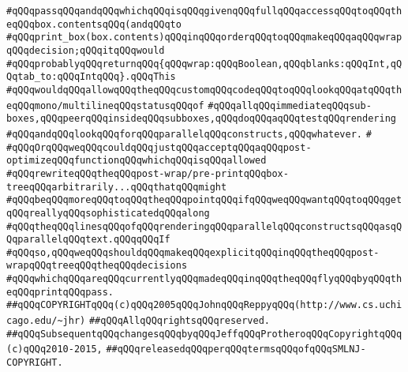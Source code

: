 \verb|#qQQqpassqQQqandqQQqwhichqQQqisqQQqgivenqQQqfullqQQqaccessqQQqtoqQQqtheqQQqbox.contentsqQQq(andqQQqto|\newline
\verb|#qQQqprint_box(box.contents)qQQqinqQQqorderqQQqtoqQQqmakeqQQqaqQQqwrapqQQqdecision;qQQqitqQQqwould|\newline
\verb|#qQQqprobablyqQQqreturnqQQq{qQQqwrap:qQQqBoolean,qQQqblanks:qQQqInt,qQQqtab_to:qQQqIntqQQq}.qQQqThis|\newline
\verb|#qQQqwouldqQQqallowqQQqtheqQQqcustomqQQqcodeqQQqtoqQQqlookqQQqatqQQqtheqQQqmono/multilineqQQqstatusqQQqof|\newline
\verb|#qQQqallqQQqimmediateqQQqsub-boxes,qQQqpeerqQQqinsideqQQqsubboxes,qQQqdoqQQqaqQQqtestqQQqrendering|\newline
\verb|#qQQqandqQQqlookqQQqforqQQqparallelqQQqconstructs,qQQqwhatever.|\newline
\verb|#|\newline
\verb|#qQQqOrqQQqweqQQqcouldqQQqjustqQQqacceptqQQqaqQQqpost-optimizeqQQqfunctionqQQqwhichqQQqisqQQqallowed|\newline
\verb|#qQQqrewriteqQQqtheqQQqpost-wrap/pre-printqQQqbox-treeqQQqarbitrarily...qQQqthatqQQqmight|\newline
\verb|#qQQqbeqQQqmoreqQQqtoqQQqtheqQQqpointqQQqifqQQqweqQQqwantqQQqtoqQQqgetqQQqreallyqQQqsophisticatedqQQqalong|\newline
\verb|#qQQqtheqQQqlinesqQQqofqQQqrenderingqQQqparallelqQQqconstructsqQQqasqQQqparallelqQQqtext.qQQqqQQqIf|\newline
\verb|#qQQqso,qQQqweqQQqshouldqQQqmakeqQQqexplicitqQQqinqQQqtheqQQqpost-wrapqQQqtreeqQQqtheqQQqdecisions|\newline
\verb|#qQQqwhichqQQqareqQQqcurrentlyqQQqmadeqQQqinqQQqtheqQQqflyqQQqbyqQQqtheqQQqprintqQQqpass.|\newline
\newline
\newline
\newline
\verb|##qQQqCOPYRIGHTqQQq(c)qQQq2005qQQqJohnqQQqReppyqQQq(http://www.cs.uchicago.edu/~jhr)|\newline
\verb|##qQQqAllqQQqrightsqQQqreserved.|\newline
\verb|##qQQqSubsequentqQQqchangesqQQqbyqQQqJeffqQQqProtheroqQQqCopyrightqQQq(c)qQQq2010-2015,|\newline
\verb|##qQQqreleasedqQQqperqQQqtermsqQQqofqQQqSMLNJ-COPYRIGHT.|\newline

